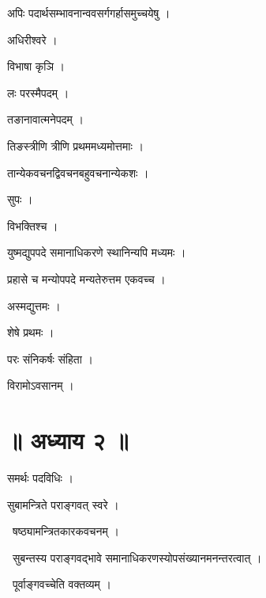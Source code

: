 \documentclass[10pt, openany, oneside]{book}
\begin{document}
\noindent अपिः पदार्थसम्भावनान्ववसर्गगर्हासमुच्चयेषु ।

\noindent अधिरीश्वरे ।

\noindent विभाषा कृञि ।

\noindent लः परस्मैपदम् ।

\noindent तङानावात्मनेपदम् ।

\noindent तिङस्त्रीणि त्रीणि प्रथममध्यमोत्तमाः ।

\noindent तान्येकवचनद्विवचनबहुवचनान्येकशः ।

\noindent सुपः ।

\noindent विभक्तिश्च ।

\noindent युष्मद्युपपदे समानाधिकरणे स्थानिन्यपि मध्यमः ।

\noindent प्रहासे च मन्योपपदे मन्यतेरुत्तम एकवच्च ।

\noindent अस्मद्युत्तमः ।

\noindent शेषे प्रथमः ।

\noindent परः संनिकर्षः संहिता ।

\noindent विरामोऽवसानम् ।

\section*{॥ अध्याय २ ॥}

\noindent समर्थः पदविधिः ।

\noindent सुबामन्त्रिते पराङ्गवत् स्वरे ।

\par\noindent\hspace{1.5em}{\vps वा॰}~{\qt षष्ठ्यामन्त्रितकारकवचनम् ।}

\par\noindent\hspace{1.5em}{\vps वा॰}~{\qt सुबन्तस्य पराङ्गवद्भावे समानाधिकरणस्योपसंख्यानमनन्तरत्वात् ।}

\par\noindent\hspace{1.5em}{\vps वा॰}~{\qt पूर्वाङ्गवच्चेति वक्तव्यम् ।}
\end{document}
